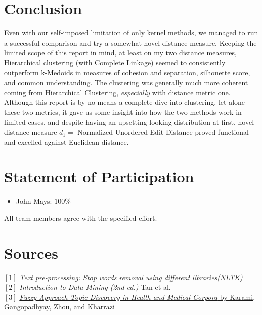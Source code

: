 \documentclass[fleqn]{article}
\begin{document}
\section{Conclusion}
Even with our self-imposed limitation of only kernel methods, we managed to run a successful comparison and try a somewhat novel distance measure.  Keeping the limited scope of this report in mind, at least on my two distance measures, Hierarchical clustering (with Complete Linkage) seemed to consistently outperform k-Medoids in measures of cohesion and separation, silhouette score, and common understanding.  The clustering was generally much more coherent coming from Hierarchical Clustering, \textit{especially} with distance metric one.  Although this report is by no means a complete dive into clustering, let alone these two metrics, it gave us some insight into how the two methods work in limited cases, and despite having an upsetting-looking distribution at first, novel distance measure $d_1=$ Normalized Unordered Edit Distance proved functional and excelled against Euclidean distance.


\section*{Statement of Participation}
\begin{itemize}
	\item John Mays: $100\%$
\end{itemize}
All team members agree with the specified effort.

\section*{Sources}
$[1]$ \href{https://towardsdatascience.com/text-pre-processing-stop-words-removal-using-different-libraries-f20bac19929a}{\textit{Text pre-processing: Stop words removal using different libraries(NLTK)}}\\
$[2]$ \textit{Introduction to Data Mining (2nd ed.)} Tan et al.\\
$[3]$ \href{https://arxiv.org/abs/1705.00995}{\textit{Fuzzy Approach Topic Discovery in Health and Medical Corpora} by Karami, Gangopadhyay, Zhou, and Kharrazi}
\end{document}
